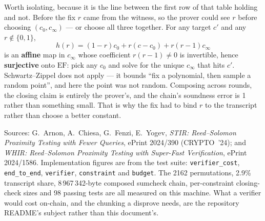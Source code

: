 \documentclass[11pt,a4paper]{article}
\begin{document}
Worth isolating, because it is the line between the first row of that table holding and not. Before
the fix $r$ came from the witness, so the prover could see $r$ before choosing
$(c_{0},c_{\infty})$ --- or choose all three together. For any target $c'$ and any $r\notin\{0,1\}$,
\[
  h(r)=(1-r)c_{0}+r(c-c_{0})+r(r-1)c_{\infty}
\]
is an \textbf{affine} map in $c_{\infty}$ whose coefficient $r(r-1)\neq0$ is invertible, hence
\textbf{surjective} onto $\mathrm{EF}$: pick any $c_{0}$ and solve for the unique $c_{\infty}$ that
hits $c'$. Schwartz--Zippel does not apply --- it bounds ``fix a polynomial, then sample a random
point'', and here the point was not random. Composing across rounds, the closing claim is entirely
the prover's, and the chain's soundness error is 1 rather than something small. That is why the fix
had to bind $r$ to the transcript rather than choose a better constant.

\vspace{1.5em}
\noindent{\color{rule}\rule{\linewidth}{0.6pt}}
\par\vspace{0.5em}
\noindent\footnotesize\color{muted}
Sources: G.~Arnon, A.~Chiesa, G.~Fenzi, E.~Yogev, \emph{STIR: Reed--Solomon Proximity Testing with
Fewer Queries}, ePrint 2024/390 (CRYPTO~'24); and \emph{WHIR: Reed--Solomon Proximity Testing with
Super-Fast Verification}, ePrint 2024/1586. Implementation figures are from the test suite:
\texttt{verifier\_cost}, \texttt{end\_to\_end}, \texttt{verifier},
\texttt{constraint} and \texttt{budget}. The 2162 permutations, 2.9\% transcript share, 8\,967\,342-byte
composed sumcheck chain, per-constraint closing-check sizes and 98 passing tests are all measured on
this machine. What a verifier would cost on-chain, and the
chunking a disprove needs, are the repository README's subject rather than this document's.
\end{document}
